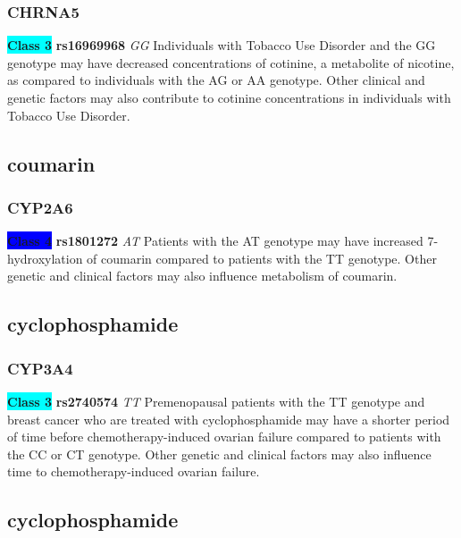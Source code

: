 \documentclass{book}
\begin{document}
\subsubsection{ CHRNA5 }

\begin{center}
\textbf{\colorbox{cyan} {Class 3}} \textbf{ rs16969968 } \textit{ GG }
Individuals with Tobacco Use Disorder and the GG genotype may have decreased concentrations of cotinine, a metabolite of nicotine, as compared to individuals with the AG or AA genotype. Other clinical and genetic factors may also contribute to cotinine concentrations in individuals with Tobacco Use Disorder.


\end{center}\subsection{ coumarin }


\subsubsection{ CYP2A6 }

\begin{center}

\textbf{\colorbox{blue} {Class 4}} \textbf{ rs1801272 } \textit{ AT }
Patients with the AT genotype may have increased 7-hydroxylation of coumarin compared to patients with the TT genotype. Other genetic and clinical factors may also influence metabolism of coumarin.

\end{center}\subsection{ cyclophosphamide }


\subsubsection{ CYP3A4 }

\begin{center}
\textbf{\colorbox{cyan} {Class 3}} \textbf{ rs2740574 } \textit{ TT }
Premenopausal patients with the TT genotype and breast cancer who are treated with cyclophosphamide may have a shorter period of time before chemotherapy-induced ovarian failure compared to patients with the CC or CT genotype. Other genetic and clinical factors may also influence time to chemotherapy-induced ovarian failure.


\end{center}\subsection{ cyclophosphamide }
\end{document}
